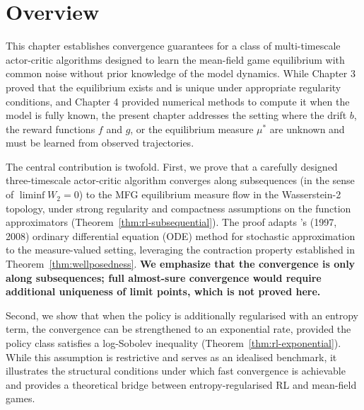 
\section{Overview}

This chapter establishes convergence guarantees for a class of multi-timescale
actor-critic algorithms designed to learn the mean-field game equilibrium with common
noise without prior knowledge of the model dynamics. While Chapter 3 proved that the
equilibrium exists and is unique under appropriate regularity conditions, and Chapter
4 provided numerical methods to compute it when the model is fully known, the present
chapter addresses the setting where the drift $b$, the reward functions $f$ and $g$,
or the equilibrium measure $\mu^*$ are unknown and must be learned from observed
trajectories.

The central contribution is twofold. First, we prove that a carefully designed
three-timescale actor-critic algorithm converges along subsequences (in the sense of
$\liminf W_2 = 0$) to the MFG equilibrium measure flow in the Wasserstein-2 topology,
under strong regularity and compactness assumptions on the function approximators
(Theorem~\ref{thm:rl-subsequential}). The proof adapts \citet{borkar1997,borkar2008}'s (1997, 2008) ordinary
differential equation (ODE) method for stochastic approximation to the measure-valued
setting, leveraging the contraction property established in
Theorem~\ref{thm:wellposedness}. \textbf{We emphasize that the convergence is only
along subsequences; full almost-sure convergence would require additional uniqueness
of limit points, which is not proved here.}

Second, we show that when the policy is additionally regularised with an entropy
term, the convergence can be strengthened to an exponential rate, provided the policy
class satisfies a log-Sobolev inequality (Theorem~\ref{thm:rl-exponential}). While
this assumption is restrictive and serves as an idealised benchmark, it illustrates
the structural conditions under which fast convergence is achievable and provides a
theoretical bridge between entropy-regularised RL and mean-field games.

